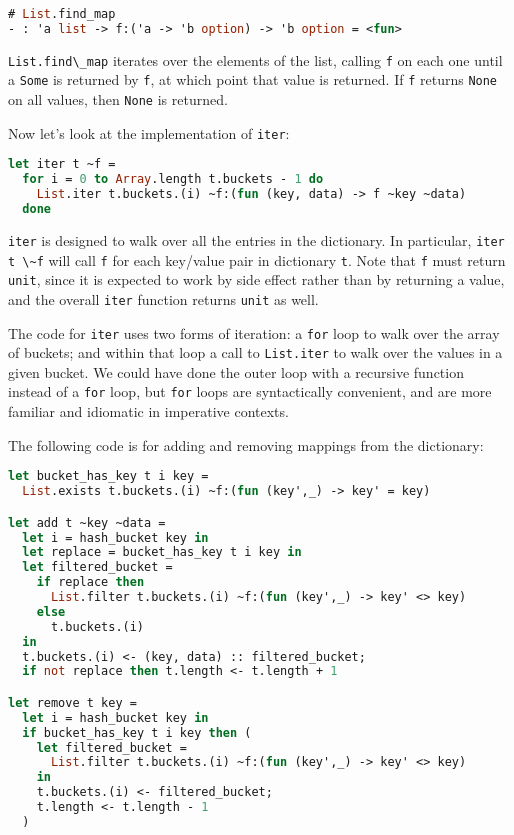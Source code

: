 \begin{lstlisting}[language=Caml]
# List.find_map
- : 'a list -> f:('a -> 'b option) -> 'b option = <fun>
\end{lstlisting}

\passthrough{\lstinline!List.find\_map!} iterates over the elements of
the list, calling \passthrough{\lstinline!f!} on each one until a
\passthrough{\lstinline!Some!} is returned by
\passthrough{\lstinline!f!}, at which point that value is returned. If
\passthrough{\lstinline!f!} returns \passthrough{\lstinline!None!} on
all values, then \passthrough{\lstinline!None!} is returned.

Now let's look at the implementation of \passthrough{\lstinline!iter!}:

\begin{lstlisting}[language=Caml]
let iter t ~f =
  for i = 0 to Array.length t.buckets - 1 do
    List.iter t.buckets.(i) ~f:(fun (key, data) -> f ~key ~data)
  done
\end{lstlisting}

\passthrough{\lstinline!iter!} is designed to walk over all the entries
in the dictionary. In particular, \passthrough{\lstinline!iter t \~f!}
will call \passthrough{\lstinline!f!} for each key/value pair in
dictionary \passthrough{\lstinline!t!}. Note that
\passthrough{\lstinline!f!} must return \passthrough{\lstinline!unit!},
since it is expected to work by side effect rather than by returning a
value, and the overall \passthrough{\lstinline!iter!} function returns
\passthrough{\lstinline!unit!} as well.

The code for \passthrough{\lstinline!iter!} uses two forms of iteration:
a \passthrough{\lstinline!for!} loop to walk over the array of buckets;
and within that loop a call to \passthrough{\lstinline!List.iter!} to
walk over the values in a given bucket. We could have done the outer
loop with a recursive function instead of a
\passthrough{\lstinline!for!} loop, but \passthrough{\lstinline!for!}
loops are syntactically convenient, and are more familiar and idiomatic
in imperative contexts.

The following code is for adding and removing mappings from the
dictionary:

\begin{lstlisting}[language=Caml]
let bucket_has_key t i key =
  List.exists t.buckets.(i) ~f:(fun (key',_) -> key' = key)

let add t ~key ~data =
  let i = hash_bucket key in
  let replace = bucket_has_key t i key in
  let filtered_bucket =
    if replace then
      List.filter t.buckets.(i) ~f:(fun (key',_) -> key' <> key)
    else
      t.buckets.(i)
  in
  t.buckets.(i) <- (key, data) :: filtered_bucket;
  if not replace then t.length <- t.length + 1

let remove t key =
  let i = hash_bucket key in
  if bucket_has_key t i key then (
    let filtered_bucket =
      List.filter t.buckets.(i) ~f:(fun (key',_) -> key' <> key)
    in
    t.buckets.(i) <- filtered_bucket;
    t.length <- t.length - 1
  )
\end{lstlisting}

